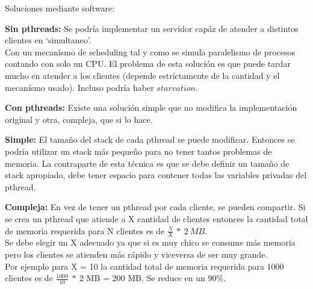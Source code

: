 Soluciones mediante software:
\begin{description}
 \item \textbf{Sin pthreads:} Se podría implementar un servidor capáz de atender a distintos clientes en \textquoteleft simultaneo\textquoteright.\\
 Con un mecanísmo de scheduling tal y como se simula paralelismo de procesos contando con solo un CPU.  
 El problema de esta solución es que puede tardar mucho en atender a los clientes (depende estríctamente de la cantidad y el mecanísmo usado).
 Incluso podría haber $starvation$.
 
 \item \textbf{Con pthreads:} Existe una solución simple que no modifica la implementación original y otra, compleja, que si lo hace.
 
    \begin{description} 
    \item \textbf{Simple:} El tamaño del stack de cada pthread se puede modificar. Entonces se podría utilizar un stack más pequeño para no tener
    tantos problemas de memoria. La contraparte de esta técnica es que se debe definir un tamaño de stack apropiado, debe tener espacio para contener
    todas las variables privadas del pthread.
    
    \item \textbf{Compleja:} En vez de tener un pthread por cada cliente, se pueden compartir. Si se crea un pthread que atiende a X cantidad de clientes 
    entonces la cantidad total de memoria requerida para N clientes es de $\frac{N}{X}\ *\ 2\ MB$.\\
    Se debe elegir un X adecuado ya que si es muy chico se consume más memoria pero los clientes se atienden más rápido y viceversa de ser muy grande.\\
    Por ejemplo para X = 10 la cantidad total de memoria requerida para 1000 clientes es de $\frac{1000}{10}\ *\ 2$ MB = 200 MB. Se reduce en un 90\%.
    \end{description}
    
\end{description}